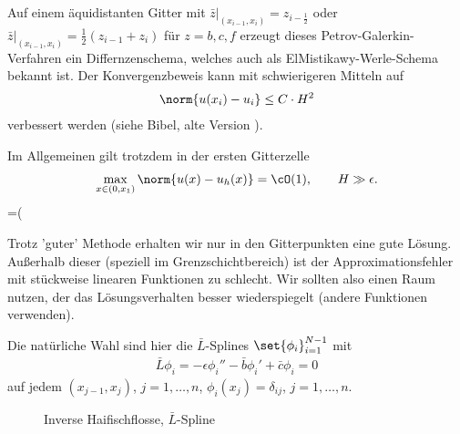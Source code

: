 \begin{bemerkung*}
  Auf einem äquidistanten Gitter mit $\bar z|_{(x_{i-1}, x_{i})} = z_{i - \frac 12}$ oder $\bar z|_{(x_{i-1}, x_{i})} = \frac 12 (z_{i-1} + z_{i})$ für $z = b, c, f$ erzeugt dieses Petrov-Galerkin-Verfahren ein Differnzenschema, welches auch als ElMistikawy-Werle-Schema bekannt ist. Der Konvergenzbeweis kann mit schwierigeren Mitteln auf
  \begin{align*}
    \norm{u(x_{i}) - u_{i}} \leq C\cdot H^{2}
  \end{align*}
  verbessert werden (siehe Bibel, alte Version ).
\end{bemerkung*}
Im Allgemeinen gilt trotzdem in der ersten Gitterzelle
\begin{align*}
  \max_{x \in (0, x_{1})} \norm{u(x) - u_{h}(x)} = \cO(1), \qquad H \gg\epsilon. 
\end{align*}
=(


Trotz 'guter' Methode erhalten wir nur in den Gitterpunkten eine gute Lösung. Außerhalb dieser (speziell im Grenzschichtbereich) ist der Approximationsfehler mit stückweise linearen Funktionen zu schlecht. Wir sollten also einen Raum nutzen, der das Lösungsverhalten besser wiederspiegelt (andere Funktionen verwenden). 

Die natürliche Wahl sind hier die $\bar L$-Splines $ \set{\phi_{i}}_{i = 1}^{N-1}$ mit
\begin{align*}
  \bar L \phi_{i} = - \epsilon \phi_{i}''  - \bar b \phi_{i}' + \bar c \phi_{i} = 0
\end{align*}
auf jedem $(x_{j-1}, x_{j})$, $j = 1, \dots, n$, $\phi_{i}(x_{j}) = \delta_{ij}$, $j = 1, \dots, n$. 

\begin{figure}[bht!]
  \centering
  \caption{Inverse Haifischflosse, $\bar L$-Spline}
  \label{fig:hai2}
\end{figure}

